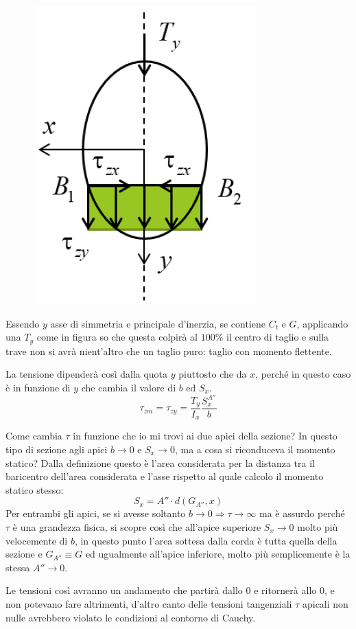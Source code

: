 \begin{figure}[H]
	\centering
	\label{fig:screenshot006}
	\includegraphics[width=0.2\linewidth]{immagini_6/screenshot006}
\end{figure}

		Essendo $y$ asse di simmetria e principale d'inerzia, se contiene $C_t$ e $G$, applicando una $T_y$ come in figura so che questa colpirà al $100\%$ il centro di taglio e sulla trave non si avrà nient'altro che un taglio puro: taglio con momento flettente. \newline 
		
		La tensione dipenderà così dalla quota $y$ piuttosto che da $x$, perché in questo caso è in funzione di $y$ che cambia il valore di $b$ ed $S_x$. 
		\[ \tau_{zm} = \tau_{zy} = \dfrac{T_y}{I_x}\dfrac{S_x^{A''}}{b}\]
		
		Come cambia $\tau$  in funzione che io mi trovi ai due apici della sezione? In questo tipo di sezione agli apici $b\rightarrow0$ e $S_x\rightarrow0$, ma a cosa si riconduceva il momento statico? Dalla definizione questo è l'area considerata per la distanza tra il baricentro dell'area considerata e l'asse rispetto al quale calcolo il momento statico stesso:
		\[S_x = A'' \cdot d(G_{A''}, x)\]
		Per entrambi gli apici, se si avesse soltanto $b\rightarrow0 \Rightarrow\tau\rightarrow\infty$ ma è assurdo perché $\tau$ è una grandezza fisica, si scopre così che all'apice superiore $S_x\rightarrow0$ molto più velocemente di $b$, in questo punto l'area sottesa dalla corda è tutta quella della sezione e $G_{A''}\equiv G$ ed ugualmente all'apice inferiore, molto più semplicemente è la stessa $A'' \rightarrow0$. \newline 
		
		Le tensioni così avranno un andamento che partirà dallo $0$ e ritornerà allo $0$, e non potevano fare altrimenti, d'altro canto delle tensioni tangenziali $\tau$ apicali non nulle avrebbero violato le condizioni al contorno di Cauchy. \newline 
		
